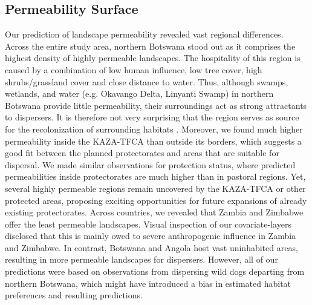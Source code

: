 \documentclass[abstract=on,10pt,a4paper,bibliography=totocnumbered]{scrartcl}
\begin{document}
\subsection{Permeability Surface}
Our prediction of landscape permeability revealed vast regional differences.
Across the entire study area, northern Botswana stood out as it comprises the
highest density of highly permeable landscapes. The hospitality of this region
is caused by a combination of low human influence, low tree cover, high
shrubs/grassland cover and close distance to water. Thus, although swamps,
wetlands, and water (e.g. Okavango Delta, Linyanti Swamp) in northern Botswana
provide little permeability, their surroundings act as strong attractants to
dispersers. It is therefore not very surprising that the region serves as source
for the recolonization of surrounding habitats \citep{Cozzi.2013}. Moreover, we
found much higher permeability inside the KAZA-TFCA than outside its borders,
which suggests a good fit between the planned protectorates and areas that are
suitable for dispersal. We made similar observations for protection status,
where predicted permeabilities inside protectorates are much higher than in
pastoral regions. Yet, several highly permeable regions remain uncovered by the
KAZA-TFCA or other protected areas, proposing exciting opportunities for future
expansions of already existing protectorates. Across countries, we revealed that
Zambia and Zimbabwe offer the least permeable landscapes. Visual inspection of
our covariate-layers disclosed that this is mainly owed to severe anthropogenic
influence in Zambia and Zimbabwe. In contrast, Botswana and Angola host vast
uninhabited areas, resulting in more permeable landscapes for dispersers.
However, all of our predictions were based on observations from dispersing wild
dogs departing from northern Botswana, which might have introduced a bias in
estimated habitat preferences and resulting predictions.
\end{document}
